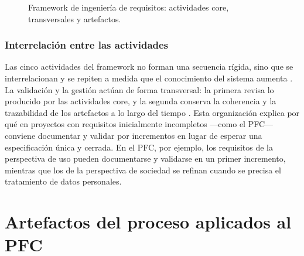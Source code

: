 \documentclass[onecolumn,12pt]{IEEEtran}
\begin{document}
\begin{figure}[htbp]
\centering
{}
\caption{Framework de ingenier\'ia de requisitos: actividades core, transversales y artefactos.}
\label{fig:framework}
\end{figure}

\subsubsection{Interrelaci\'on entre las actividades}
Las cinco actividades del framework no forman una secuencia r\'igida, sino que se interrelacionan y se repiten a medida que el conocimiento del sistema aumenta \cite{pohl2025}. La validaci\'on y la gesti\'on act\'uan de forma transversal: la primera revisa lo producido por las actividades core, y la segunda conserva la coherencia y la trazabilidad de los artefactos a lo largo del tiempo \cite{pohl2025,iso29148}. Esta organizaci\'on explica por qu\'e en proyectos con requisitos inicialmente incompletos ---como el PFC--- conviene documentar y validar por incrementos en lugar de esperar una especificaci\'on \'unica y cerrada. En el PFC, por ejemplo, los requisitos de la perspectiva de uso pueden documentarse y validarse en un primer incremento, mientras que los de la perspectiva de sociedad se refinan cuando se precisa el tratamiento de datos personales.


\section{Artefactos del proceso aplicados al PFC}
\end{document}
